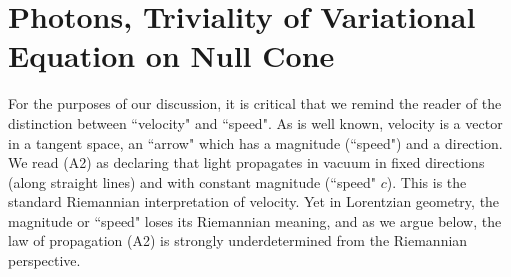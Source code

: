 \documentclass[12pt]{article}
\begin{document}


\section{Photons, Triviality of Variational Equation on Null Cone}\label{s3}


For the purposes of our discussion, it is critical that we remind the reader of the distinction between ``velocity" and ``speed".  As is well known, velocity is a vector in a tangent space, an ``arrow" which has a magnitude (``speed") and a direction. We read (A2) as declaring that light propagates in vacuum in fixed directions (along straight lines) and with constant magnitude (``speed" $c$). This is the standard Riemannian interpretation of velocity. Yet in Lorentzian geometry, the magnitude or ``speed" loses its Riemannian meaning, and as we argue below, the law of propagation (A2) is strongly underdetermined from the Riemannian perspective. 







\end{document}
